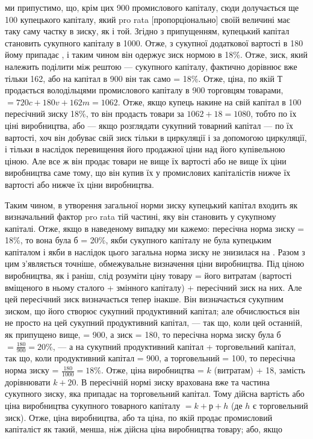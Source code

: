 \parcont{}  %
ми припустимо, що, крім цих 900 промислового
капіталу, сюди долучається ще 100 купецького
капіталу, який pro rata [пропорціонально] своїй величині має
таку саму частку в зиску, як і той. Згідно з припущенням,
купецький капітал становить  сукупного капіталу в 1000.
Отже, з сукупної додаткової вартості в 180 йому припадає ,
і таким чином він одержує зиск нормою в 18\%. Отже, зиск,
який належить поділити між рештою —  сукупного капіталу,
фактично дорівнює вже тільки 162, або на капітал в 900 він так
само = 18\%. Отже, ціна, по якій $Т$ продається володільцями промислового
капіталу в 900 торговцям товарами, $= 720c + 180v + 162m = 1062$.
Отже, якщо купець накине на свій капітал
в 100 пересічний зиску 18\%, то він продасть товари за $1062 + 18 = 1080$,
тобто по їх ціні виробництва, або — якщо розглядати
сукупний товарний капітал — по їх вартості, хоч він добуває
свій зиск тільки в циркуляції і за допомогою циркуляції, і тільки
в наслідок перевищення його продажної ціни над його купівельною
ціною. Але все ж він продає товари не вище їх вартості
або не вище їх ціни виробництва саме тому, що він купив їх
у промислових капіталістів нижче їх вартості або нижче їх ціни
виробництва.

Таким чином, в утворення загальної норми зиску купецький
капітал входить як визначальний фактор pro rata тій частині,
яку він становить у сукупному капіталі. Отже, якщо в наведеному
випадку ми кажемо: пересічна норма зиску = 18\%, то вона
була б = 20\%, якби  сукупного капіталу не була купецьким
капіталом і якби в наслідок цього загальна норма зиску не знизилася
на . Разом з цим з’являється точніше, обмежувальне визначення
ціни виробництва. Під ціною виробництва, як і раніш,
слід розуміти ціну товару = його витратам (вартості вміщеного
в ньому сталого + змінного капіталу) + пересічний зиск на них.
Але цей пересічний зиск визначається тепер інакше. Він визначається
сукупним зиском, що його створює сукупний продуктивний
капітал; але обчислюється він не просто на цей сукупний
продуктивний капітал, — так що, коли цей останній, як
припущено вище, = 900, а зиск = 180, то пересічна норма зиску
була б $= \frac{180}{900} = 20\%$, — а на сукупний продуктивний капітал + торговельний
капітал, так що, коли продуктивний капітал = 900, а торговельний = 100, то пересічна норма зиску =
$\frac{180}{1000} = 18\%$.
Отже, ціна виробництва = $k$ (витратам) + 18, замість дорівнювати
$k + 20$. В пересічній нормі зиску врахована вже та частина
сукупного зиску, яка припадає на торговельний капітал. Тому
дійсна вартість або ціна виробництва сукупного товарного капіталу
$= k + р + h$ (де $h$ є торговельний зиск). Отже, ціна виробництва,
або та ціна, по якій продає промисловий капіталіст як
такий, менша, ніж дійсна ціна виробництва товару; або, якщо
\parbreak{}  %
